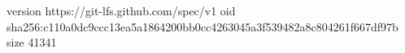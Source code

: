 version https://git-lfs.github.com/spec/v1
oid sha256:c110a0dc9ccc13ea5a1864200bb0cc4263045a3f539482a8c804261f667df97b
size 41341
